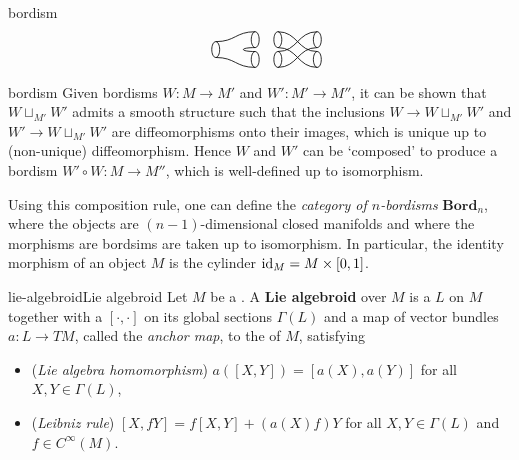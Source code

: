\begin{example}{bordism}
\[        \quad
        \begin{tikzpicture}[semithick, scale=0.5, baseline=-0.5ex] \begin{scope} \draw (-1,0) ellipse (0.2cm and 0.4cm); \draw (1,0.5) ellipse (0.2cm and 0.4cm); \draw (1,-0.5) ellipse (0.2cm and 0.4cm); \draw (-1,0.4) .. controls (0,0.4) and (0,0.9) .. (1,0.9); \draw (-1,-0.4) .. controls (0,-0.4) and (0,-0.9) .. (1,-0.9); \draw (1,0.1) .. controls (0.2,0.1) and (0.2,-0.1) .. (1,-0.1); \end{scope} \end{tikzpicture}
        \quad
        \begin{tikzpicture}[semithick, scale=0.5, baseline=-0.5ex] \begin{scope} \draw (-1,0.5) ellipse (0.2cm and 0.4cm); \draw (-1,-0.5) ellipse (0.2cm and 0.4cm); \draw (1,0.5) ellipse (0.2cm and 0.4cm); \draw (1,-0.5) ellipse (0.2cm and 0.4cm); \draw (-1,0.9) .. controls (0,0.9) and (0,-0.1) .. (1,-0.1); \draw (-1,0.1) .. controls (0,0.1) and (0,-0.9) .. (1,-0.9); \draw (-1,-0.9) .. controls (0,-0.9) and (0,0.1) .. (1,0.1); \draw (-1,-0.1) .. controls (0,-0.1) and (0,0.9) .. (1,0.9); \end{scope} \end{tikzpicture} \]
\end{example}

\begin{example}{bordism}
    Given bordisms $W : M \to M'$ and $W' : M' \to M''$, it can be shown that $W \sqcup_{M'} W'$ admits a smooth structure such that the inclusions $W \to W \sqcup_{M'} W'$ and $W' \to W \sqcup_{M'} W'$ are diffeomorphisms onto their images, which is unique up to (non-unique) diffeomorphism. Hence $W$ and $W'$ can be `composed' to produce a bordism $W' \circ W : M \to M''$, which is well-defined up to isomorphism.
    
    Using this composition rule, one can define the \textit{category of $n$-bordisms} $\textbf{Bord}_n$, where the objects are $(n - 1)$-dimensional closed manifolds and where the morphisms are bordsims are taken up to isomorphism. In particular, the identity morphism of an object $M$ is the cylinder $\textup{id}_M = M \times [0, 1]$.
\end{example}

\begin{topic}{lie-algebroid}{Lie algebroid}
    Let $M$ be a . A \textbf{Lie algebroid} over $M$ is a  $L$ on $M$ together with a  $[\cdot, \cdot]$ on its global sections $\Gamma(L)$ and a map of vector bundles $a : L \to TM$, called the \textit{anchor map}, to the  of $M$, satisfying
    \begin{itemize}
        \item (\textit{Lie algebra homomorphism}) $a([X, Y]) = [a(X), a(Y)]$ for all $X, Y \in \Gamma(L)$,
        \item (\textit{Leibniz rule}) $[X, fY] = f[X, Y] + (a(X)  f) Y$ for all $X, Y \in \Gamma(L)$ and $f \in C^\infty(M)$.
    \end{itemize}
\end{topic}

